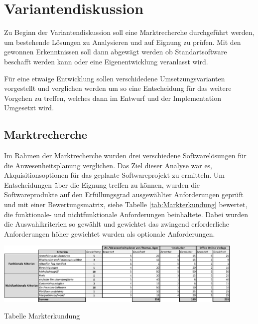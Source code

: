 \section{Variantendiskussion}
\label{sec:Variantendiskussion}
Zu Beginn der Variantendiskussion soll eine Marktrecherche durchgeführt werden, um bestehende Lösungen zu Analysieren und auf Eignung zu prüfen. Mit den gewonnen Erkenntnissen soll dann abgewägt werden ob Standartsoftware beschafft werden kann oder eine Eigenentwicklung veranlasst wird.

Für eine etwaige Entwicklung sollen verschidedene Umsetzungsvarianten vorgestellt und verglichen werden um so eine Entscheidung für das weitere Vorgehen zu treffen, welches dann im Entwurf und der Implementation Umgesetzt wird.

\subsection{Marktrecherche}
\label{sec:Marktrecherche}
Im Rahmen der Marktrecherche wurden drei verschiedene Softwarelösungen für die Anwesenheitsplanung verglichen. Das Ziel dieser Analyse war es, Akquisitionsoptionen für das geplante Softwareprojekt zu ermitteln. Um Entscheidungen über die Eignung treffen zu können, wurden die Softwareprodukte auf den Erfüllungsgrad ausgewählter Anforderungen geprüft und mit einer Bewertungsmatrix, siehe Tabelle \ref{tab:Markterkundung} bewertet, die funktionale- und nichtfunktionale Anforderungen beinhaltete. Dabei wurden die Auswahlkriterien so gewählt und gewichtet das zwingend erforderliche Anforderungen höher gewichtet wurden als optionale Anforderungen.

\begin{table}[htbp]
    \centering
    \includegraphics[width=0.9\textwidth,angle=0]{abb/Markterkundung.pdf}
    \caption[Beschreibung]{ Tabelle Markterkundung}
    \label{tab:Markterkundung}
\end{table}

